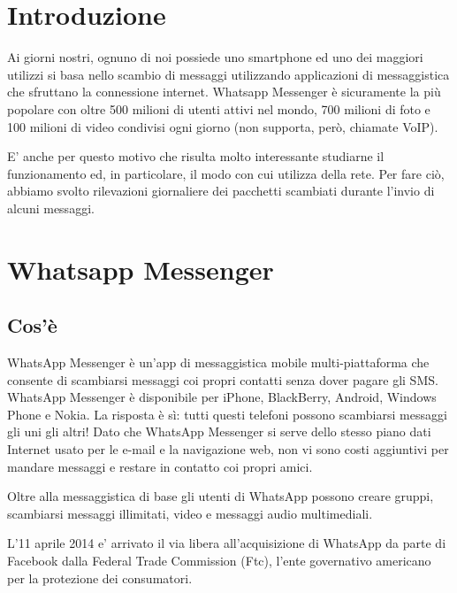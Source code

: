\documentclass[a4paper,11pt]{book}
\begin{document}
\begin{frontespizio}
\end{frontespizio}


\tableofcontents

\chapter{Introduzione}
Ai giorni nostri, ognuno di noi possiede uno smartphone ed uno dei maggiori utilizzi si basa nello scambio di messaggi utilizzando applicazioni di messaggistica che sfruttano la connessione internet.
Whatsapp Messenger è sicuramente la più popolare con oltre 500 milioni di utenti attivi nel mondo, 700 milioni di foto e 100 milioni di video condivisi ogni giorno (non supporta, però, chiamate VoIP).

E' anche per questo motivo che risulta molto interessante studiarne il funzionamento ed, in particolare, il modo con cui utilizza della rete.
Per fare ciò, abbiamo svolto rilevazioni giornaliere dei pacchetti scambiati durante l'invio di alcuni messaggi.


\chapter{Whatsapp Messenger}

\section{Cos'è}
WhatsApp Messenger è un'app di messaggistica mobile multi-piattaforma che consente di scambiarsi messaggi coi propri contatti senza dover pagare gli SMS. WhatsApp Messenger è disponibile per iPhone, BlackBerry, Android, Windows Phone e Nokia. La risposta è sì: tutti questi telefoni possono scambiarsi messaggi gli uni gli altri! Dato che WhatsApp Messenger si serve dello stesso piano dati Internet usato per le e-mail e la navigazione web, non vi sono costi aggiuntivi per mandare messaggi e restare in contatto coi propri amici.

Oltre alla messaggistica di base gli utenti di WhatsApp possono creare gruppi, scambiarsi messaggi illimitati, video e messaggi audio multimediali.

L'11 aprile 2014 e' arrivato il via libera all'acquisizione di WhatsApp da parte di Facebook dalla Federal Trade Commission (Ftc), l'ente governativo americano per la protezione dei consumatori.
\end{document}
